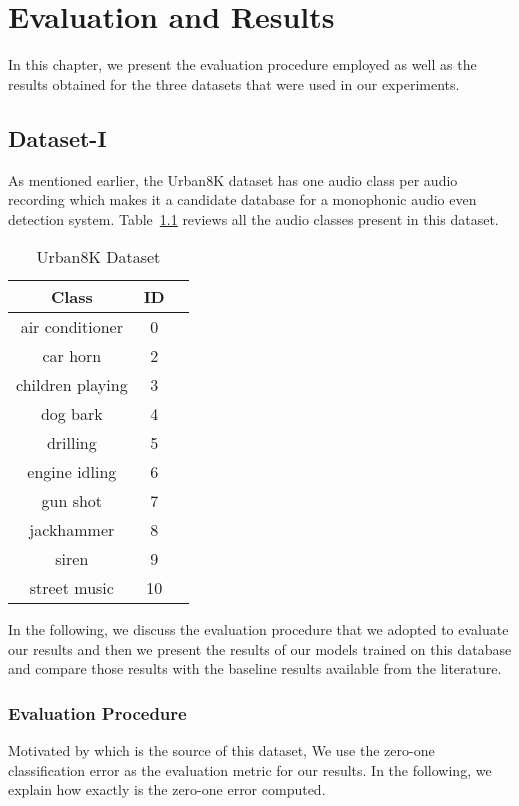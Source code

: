 \chapter{Evaluation and Results}
In this chapter, we present the evaluation procedure employed as well as the results obtained for the three datasets that were used in our experiments.

\section{Dataset-I}
As mentioned earlier, the Urban8K dataset has one audio class per audio recording which makes it a candidate database for a monophonic audio even detection system. Table~\ref{tab:db1} reviews all the audio classes present in this dataset. 

\begin{table}[tb]
\caption[Urban8K Dataset]{Urban8K Dataset}
\label{tab:db1}
\centering
\begin{tabular}{ccc}
\toprule
Class & ID \\ 
\midrule
air conditioner	& 0 \\
car horn	& 2 \\
children playing	& 3 \\
dog bark	& 4 \\
drilling	& 5 \\
engine idling	& 6 \\
gun shot	& 7 \\
jackhammer	& 8 \\
siren	& 9 \\
street music	& 10 \\
\bottomrule 
\end{tabular}
\end{table}

In the following, we discuss the evaluation procedure that we adopted to evaluate our results and then we present the results of our models trained on this database and compare those results with the baseline results available from the literature.

\subsection{Evaluation Procedure}
Motivated by \cite{salamon2014dataset} which is the source of this dataset, We use the zero-one classification error as the evaluation metric for our results. In the following, we explain how exactly is the zero-one error computed. 

